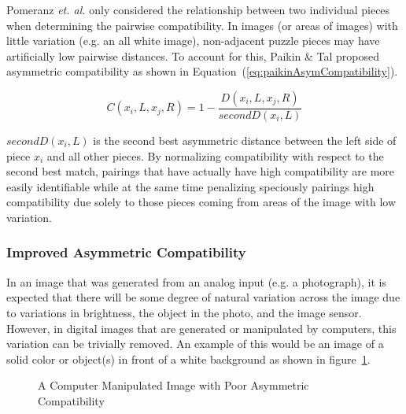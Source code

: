 \documentclass{report}
\def\eref#1{(\ref{#1})}
\begin{document}
Pomeranz \textit{et. al.} only considered the relationship between two individual pieces when determining the pairwise compatibility.  In images (or areas of images) with little variation (e.g. an all white image), non-adjacent puzzle pieces may have artificially low pairwise distances.  To account for this, Paikin \& Tal proposed asymmetric compatibility as shown in Equation~\eref{eq:paikinAsymCompatibility}.

\begin{equation} \label{eq:paikinAsymCompatibility}
C(x_i,L,x_j,R)=1 - \frac{D(x_i,L,x_j,R)}{secondD(x_i,L)}
\end{equation}

\noindent
$secondD(x_i,L)$ is the second best asymmetric distance between the left side of piece $x_i$ and all other pieces.  By normalizing compatibility with respect to the second best match, pairings that have actually have high compatibility are more easily identifiable while at the same time penalizing speciously pairings high compatibility due solely to those pieces coming from areas of the image with low variation.

\subsubsection{Improved Asymmetric Compatibility}\label{sec:hammoudehPairwiseAffinity}

In an image that was generated from an analog input (e.g. a photograph), it is expected that there will be some degree of natural variation across the image due to variations in brightness, the object in the photo, and the image sensor.  However, in digital images that are generated or manipulated by computers, this variation can be trivially removed.  An example of this would be an image of a solid color or object(s) in front of a white background as shown in figure~\ref{fig:objectWhiteBackground}.

\begin{figure}
\centering
{}
\caption{A Computer Manipulated Image with Poor Asymmetric Compatibility}
\label{fig:objectWhiteBackground}
\end{figure}
\end{document}
